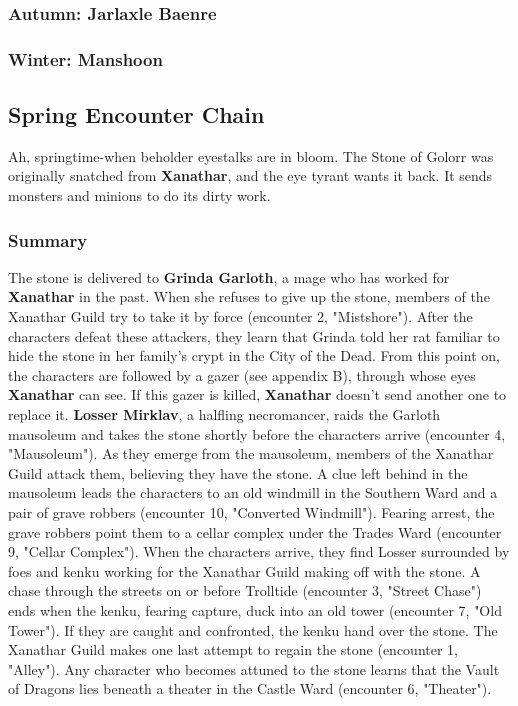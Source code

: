 \documentclass[10pt,a4paper,twoside,twocolumn,openany,nodeprecatedcode]{dndbook}
\begin{document}
\subsubsection{Autumn: Jarlaxle Baenre}
\subsubsection{Winter: Manshoon}
\subsection{Spring Encounter Chain}
Ah, springtime-when beholder eyestalks are in bloom. The Stone of Golorr was originally snatched from \textbf{Xanathar}, and the eye tyrant wants it back. It sends monsters and minions to do its dirty work.
\subsubsection{Summary}
The stone is delivered to \textbf{Grinda Garloth}, a mage who has worked for \textbf{Xanathar} in the past. When she refuses to give up the stone, members of the Xanathar Guild try to take it by force (encounter 2, "Mistshore"). After the characters defeat these attackers, they learn that Grinda told her rat familiar to hide the stone in her family's crypt in the City of the Dead. From this point on, the characters are followed by a gazer (see appendix B), through whose eyes \textbf{Xanathar} can see. If this gazer is killed, \textbf{Xanathar} doesn't send another one to replace it.
\textbf{Losser Mirklav}, a halfling necromancer, raids the Garloth mausoleum and takes the stone shortly before the characters arrive (encounter 4, "Mausoleum"). As they emerge from the mausoleum, members of the Xanathar Guild attack them, believing they have the stone. A clue left behind in the mausoleum leads the characters to an old windmill in the Southern Ward and a pair of grave robbers (encounter 10, "Converted Windmill"). Fearing arrest, the grave robbers point them to a cellar complex under the Trades Ward (encounter 9, "Cellar Complex"). When the characters arrive, they find Losser surrounded by foes and kenku working for the Xanathar Guild making off with the stone. A chase through the streets on or before Trolltide (encounter 3, "Street Chase") ends when the kenku, fearing capture, duck into an old tower (encounter 7, "Old Tower"). If they are caught and confronted, the kenku hand over the stone.
The Xanathar Guild makes one last attempt to regain the stone (encounter 1, "Alley"). Any character who becomes attuned to the stone learns that the Vault of Dragons lies beneath a theater in the Castle Ward (encounter 6, "Theater").
\end{document}
